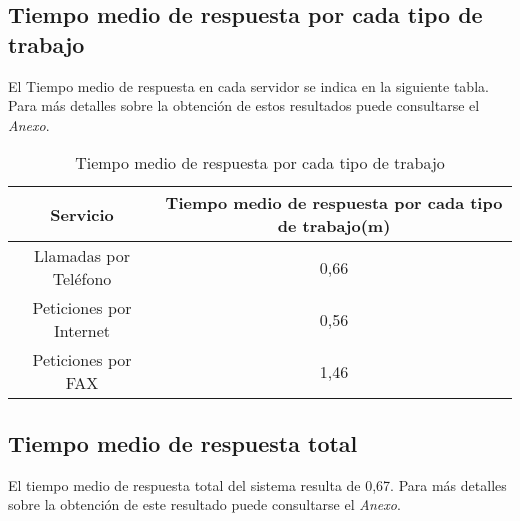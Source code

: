 \subsection{Tiempo medio de respuesta por cada tipo de trabajo}
El Tiempo medio de respuesta en cada servidor se indica en la siguiente tabla. Para más detalles sobre la obtención de estos resultados puede consultarse el \textit{Anexo}.\\

\begin{table}[H]
  \begin{center}
  \begin{tabular}{|c|c|}
    \hline
    \textbf{Servicio}       & \textbf{Tiempo medio de respuesta por cada tipo de trabajo(m)} \\ \hline
    Llamadas por Teléfono   & 0,66                   \\ \hline
    Peticiones por Internet & 0,56                  \\ \hline
    Peticiones por FAX      & 1,46                   \\ \hline
  \end{tabular}
\end{center}
  \caption{Tiempo medio de respuesta por cada tipo de trabajo}
  \end{table}
  
\subsection{Tiempo medio de respuesta total}
El tiempo medio de respuesta total del sistema resulta de 0,67. Para más detalles sobre la obtención de este resultado puede consultarse el \textit{Anexo}.\\